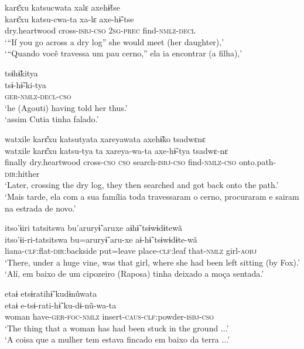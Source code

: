 \documentclass[output=paper,
modfonts,nonflat
]{langsci/langscibook}
\begin{document}
  
\ea karɛ͂xu katsucwata xalɛ axehɨ̃tse\\[.3em]
\gll karɛ͂xu				katsu-cwa-ta	xa-lɛ		 axe-hɨ̃-tse\\
dry.heartwood	cross-\textsc{isbj-cso}	\textsc{2sg-prec}	find-\textsc{nmlz-decl}\\
\glt ‘“If you go across a dry log” she would meet (her daughter),’\\
‘“Quando você travessa um pau cerno,” ela ia encontrar (a filha),'
\z

\ea tsɨhɨ̃kitya\\[.3em]
\gll tsɨ-hɨ̃-ki-tya\\
\textsc{ger-nmlz-decl-cso}\\
\glt ‘he (Agouti) having told her thus.’\\
‘assim Cutia tinha falado.'
\z

\ea watxile karɛ͂xu katsutyata xareyawata axehɨ̃ko tsadwɛnɛ\\[.3em]
\gll watxile	karɛ͂xu				katsu-tya	ta		xareya-wa-ta		axe-hɨ̃-tya{\footnotemark}	tsadwɛ-nɛ\\
finally		dry.heartwood	cross-\textsc{cso}	\textsc{cso}	search-\textsc{isbj-cso}		find-\textsc{nmlz-cso}	onto.path-\textsc{dir}:hither\\
\glt ‘Later, crossing the dry log, they{\footnotemark} then searched and got back onto the path.’\\
‘Mais tarde, ela com a sua família toda travessaram o cerno, procuraram e sairam na estrada de novo.'
\addtocounter{footnote}{-1}
\z

\ea itso'ɨiri tatsitswa bu'aruryɨ̃ aruxe aɨhɨ̃ tsɨwɨdɨtewã\\[.3em]
\gll itso'ɨi-ri-tatsitswa			bu=aruryɨ̃		aru-xe			aɨ-hɨ̃		tsɨwɨdɨte-wã\\
liana-\textsc{clf}:flat-\textsc{dir}:backside	put=leave		place-\textsc{clf}:leaf	that-\textsc{nmlz}	girl-\textsc{aobj}\\
\glt ‘There, under a huge vine, was that girl, where she had been left sitting (by Fox).’\\
‘Alí, em baixo de um cipozeiro (Raposa) tinha deixado a moça sentada.'
\z
 
\ea etaɨ etsɨratihɨ̃ kudɨnũwata\\[.3em]
\gll etaɨ		e-tsɨ-rati-hɨ̃			ku-dɨ-nũ-wa-ta\\
woman	have-\textsc{ger-foc-nmlz}	insert-\textsc{caus-clf}:powder-\textsc{isbj-cso}\\
\glt ‘The thing that a woman has{\footnotemark} had been stuck in the ground ...’\\
‘A coisa que a mulher tem estava fincado em baixo da terra ...'
\z
\end{document}
